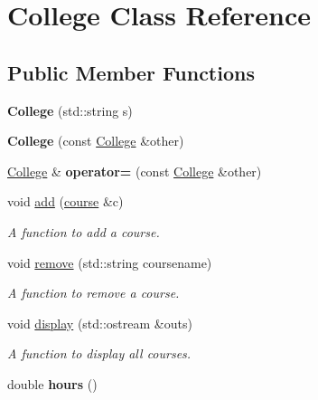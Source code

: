 \hypertarget{classCollege}{}\section{College Class Reference}
\label{classCollege}
\subsection*{Public Member Functions}
\begin{DoxyCompactItemize}
\item 
{\bfseries College} (std\+::string s)\hypertarget{classCollege_adabaf4087355e83f9f7d39f1e1498b41}{}\label{classCollege_adabaf4087355e83f9f7d39f1e1498b41}

\item 
{\bfseries College} (const \hyperlink{classCollege}{College} \&other)\hypertarget{classCollege_ad007ad488e5a7ef986114080d0c8e101}{}\label{classCollege_ad007ad488e5a7ef986114080d0c8e101}

\item 
\hyperlink{classCollege}{College} \& {\bfseries operator=} (const \hyperlink{classCollege}{College} \&other)\hypertarget{classCollege_af2194c9b37f80d13dc3fdba6784b18e8}{}\label{classCollege_af2194c9b37f80d13dc3fdba6784b18e8}

\item 
void \hyperlink{classCollege_a67fd1d8970b46b24ce2e0dd72598a22f}{add} (\hyperlink{classcourse}{course} \&c)
\begin{DoxyCompactList}\small\item\em A function to add a course. \end{DoxyCompactList}\item 
void \hyperlink{classCollege_a4d2ae513b36e6421fb1ca2c08459cfe6}{remove} (std\+::string coursename)
\begin{DoxyCompactList}\small\item\em A function to remove a course. \end{DoxyCompactList}\item 
void \hyperlink{classCollege_a52ca0a164483cf5c05591cd0fb8b300c}{display} (std\+::ostream \&outs)
\begin{DoxyCompactList}\small\item\em A function to display all courses. \end{DoxyCompactList}\item 
double {\bfseries hours} ()\hypertarget{classCollege_a8a7a762611a1d7e00c453390d49355fd}{}\label{classCollege_a8a7a762611a1d7e00c453390d49355fd}


\end{DoxyCompactItemize}
